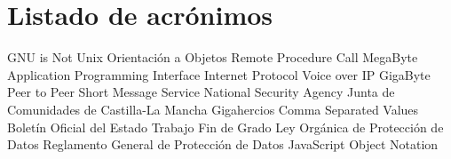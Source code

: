 \chapter{Listado de acrónimos}

{\small
\begin{acronym}[XXXXXXXX]
       {\acs{GNU} is Not Unix}
        {Orientación a Objetos}
       {Remote Procedure Call}
        {MegaByte}
       {Application Programming Interface}
        {Internet Protocol}
      {Voice over \acs{IP}}
        {GigaByte}
       {Peer to Peer}
       {Short Message Service}
       {National Security Agency}
      {Junta de Comunidades de Castilla-La Mancha}
  	 {Gigahercios}
       {Comma Separated Values}
       {Boletín Oficial del Estado}
       {Trabajo Fin de Grado}
     {Ley Orgánica de Protección de Datos}
    {Reglamento General de Protección de Datos}
    {JavaScript Object Notation}
\end{acronym}
}




